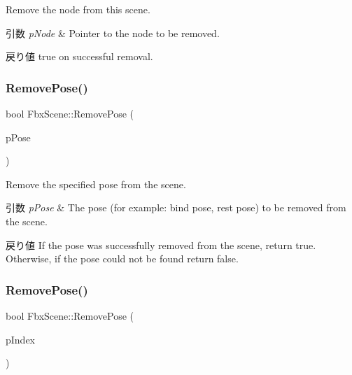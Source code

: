 Remove the node from this scene. 
\begin{DoxyParams}{引数}
{\em p\+Node} & Pointer to the node to be removed. \\
\hline
\end{DoxyParams}
\begin{DoxyReturn}{戻り値}
true on successful removal. 
\end{DoxyReturn}
\mbox{\label{class_fbx_scene_ad698fe1d231041b3a8ecf5ae3d1e2e86}} 
\subsubsection{\texorpdfstring{Remove\+Pose()}{RemovePose()}\hspace{0.1cm}{\footnotesize\ttfamily [1/2]}}
{\footnotesize\ttfamily bool Fbx\+Scene\+::\+Remove\+Pose (\begin{DoxyParamCaption}\item[{\hyperlink{class_fbx_pose}{Fbx\+Pose} $\ast$}]{p\+Pose }\end{DoxyParamCaption})}

Remove the specified pose from the scene. 
\begin{DoxyParams}{引数}
{\em p\+Pose} & The pose (for example\+: bind pose, rest pose) to be removed from the scene. \\
\hline
\end{DoxyParams}
\begin{DoxyReturn}{戻り値}
If the pose was successfully removed from the scene, return {\ttfamily true}. Otherwise, if the pose could not be found return {\ttfamily false}. 
\end{DoxyReturn}
\mbox{\label{class_fbx_scene_a480cd0951e983a20ae2014a981054db6}} 
\subsubsection{\texorpdfstring{Remove\+Pose()}{RemovePose()}\hspace{0.1cm}{\footnotesize\ttfamily [2/2]}}
{\footnotesize\ttfamily bool Fbx\+Scene\+::\+Remove\+Pose (\begin{DoxyParamCaption}\item[{int}]{p\+Index }\end{DoxyParamCaption})}

